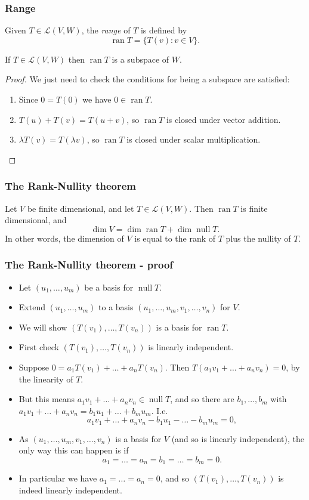 \documentclass[handout]{beamer}
\newcommand{\cL}{\mathcal{L}}
\DeclareMathOperator{\nul}{\mathrm{null}}
\DeclareMathOperator{\ran}{\mathrm{ran}}
\begin{document}
\begin{frame}
\frametitle{Range}

\begin{definition}
Given $T\in\cL(V,W)$, the \emph{range} of $T$ is defined by
\[\ran T = \{T(v) : v\in V\}.\]
\end{definition}

\begin{lemma}
If $T\in \cL(V,W)$ then $\ran T$ is a subspace of $W$.
\end{lemma}
\begin{proof}
We just need to check the conditions for being a subspace are satisfied: 
\begin{enumerate}
\item Since $0= T(0)$ we have $0\in \ran T$.
\item $T(u) + T(v) = T(u + v)$, so $\ran T$ is closed under vector addition.
\item $\lambda T(v) = T(\lambda v)$, so $\ran T$ is closed under scalar multiplication.
\end{enumerate}
\end{proof}
\end{frame}

\begin{frame}
\frametitle{The Rank-Nullity theorem}
\begin{theorem}
Let $V$ be finite dimensional, and let $T\in\cL(V,W)$. Then $\ran T$ is finite dimensional, and
\[\dim V = \dim \ran T + \dim \nul T.\]
In other words, the dimension of $V$ is equal to the rank of $T$ plus the nullity of $T$.
\end{theorem}
\end{frame}

\begin{frame}
\frametitle{The Rank-Nullity theorem - proof}
\begin{itemize}
\item Let $(u_1,\ldots,u_m)$ be a basis for $\nul T$. 
\item Extend $(u_1,\ldots,u_m)$ to a basis $(u_1,\ldots,u_m,v_1,\ldots,v_n)$ for $V$. 
\item We will show $(T(v_1),\ldots, T(v_n))$ is a basis for $\ran T$. 
\item First check $(T(v_1),\ldots, T(v_n))$ is linearly independent. 
\item Suppose $0 = a_1T(v_1)+\ldots + a_n T(v_n)$. Then $T(a_1v_1+\ldots +a_n v_n) = 0$, by the linearity of $T$. 
\item But this means $a_1v_1+\ldots +a_n v_n\in \nul T$, and so there are $b_1,\ldots, b_m$ with $a_1v_1+\ldots +a_n v_n = b_1u_1+\ldots + b_m u_m$. I.e.
\[a_1v_1+\ldots +a_n v_n - b_1u_1-\ldots - b_m u_m = 0,\] 
\item As $(u_1,\ldots,u_m,v_1,\ldots,v_n)$ is a basis for $V$ (and so is linearly independent), the only way this can happen is if 
\[a_1=\ldots =a_n = b_1=\ldots = b_m = 0.\] 
\item In particular we have $a_1=\ldots =a_n = 0$, and so $(T(v_1),\ldots, T(v_n))$ is indeed linearly independent.
\end{itemize} 
\end{frame}
\end{document}
